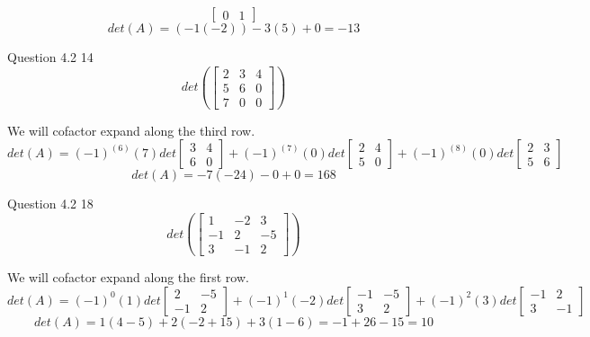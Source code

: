\documentclass[answers,12pt,addpoints]{exam}
\begin{document}
\begin{questions}
\begin{solution}
$$\begin{bmatrix}
            0 & 1
        \end{bmatrix}$$
        $$ det(A) = (-1(-2))  - 3(5) + 0 = -13$$
    \end{solution}
    \item Question 4.2 14
    $$det\left( \begin{bmatrix}
        2 & 3 & 4 \\
        5 & 6 & 0 \\
        7 & 0 & 0
    \end{bmatrix}\right)$$
    \begin{solution}
        We will cofactor expand along the third row.
        $$det(A) = (-1)^{(6)} (7) det\begin{bmatrix}
            3 & 4\\
            6 & 0
        \end{bmatrix} + (-1)^{(7)} (0) det\begin{bmatrix}
            2 & 4\\
            5 & 0
        \end{bmatrix} + (-1)^{(8)} (0) det\begin{bmatrix}
            2 & 3\\
            5 & 6
        \end{bmatrix}$$
        $$det(A) = -7(-24) - 0 + 0 = 168$$
    \end{solution}
    \item Question 4.2 18
    $$det\left( \begin{bmatrix}
        1 & -2 & 3 \\
        -1 & 2 & -5 \\
        3 & -1 & 2
    \end{bmatrix} \right)$$
    \begin{solution}
        We will cofactor expand along the first row.
        $$det(A) = (-1)^{0} (1) det\begin{bmatrix}
            2 & -5\\
            -1 & 2
        \end{bmatrix} + (-1)^{1} (-2) det\begin{bmatrix}
            -1 & -5\\
            3 & 2
        \end{bmatrix} + (-1)^{2} (3) det\begin{bmatrix}
            -1 & 2\\
            3 & -1
        \end{bmatrix}$$
        $$det(A) = 1(4 - 5) + 2(-2 + 15) + 3(1 - 6) = -1 + 26 - 15 = 10$$

\end{solution}
\end{questions}
\end{document}
